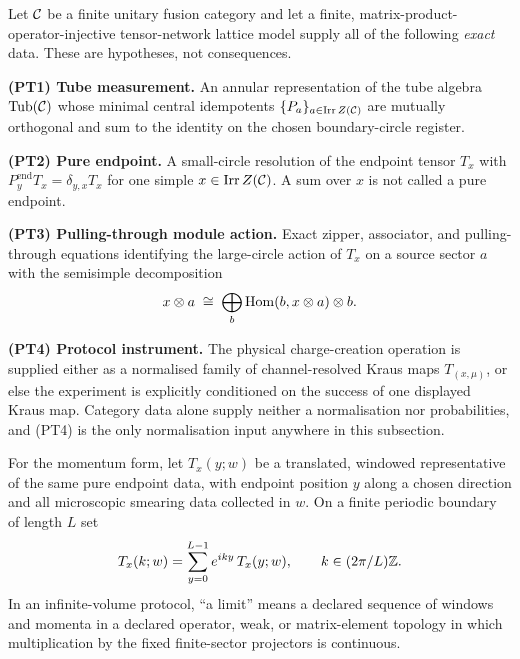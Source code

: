 \begin{definition}\label{def:peps-typing}
Let $\mathcal{C}$ be a finite unitary fusion category and let a finite,
matrix-product-operator-injective tensor-network lattice model supply all of
the following \emph{exact} data. These are hypotheses, not consequences.

\smallskip
\noindent\textbf{(PT1) Tube measurement.} An annular representation of the
tube algebra $\operatorname{Tub}(\mathcal{C})$ whose minimal central idempotents
$\{P_a\}_{a\in\operatorname{Irr}Z(\mathcal{C})}$ are mutually orthogonal and sum to
the identity on the chosen boundary-circle register.

\noindent\textbf{(PT2) Pure endpoint.} A small-circle resolution of the
endpoint tensor $T_x$ with $P^{\mathrm{end}}_yT_x=\delta_{y,x}T_x$ for one
simple $x\in\operatorname{Irr}Z(\mathcal{C})$. A sum over $x$ is not called a pure
endpoint.

\noindent\textbf{(PT3) Pulling-through module action.} Exact zipper,
associator, and pulling-through equations identifying the large-circle action
of $T_x$ on a source sector $a$ with the semisimple decomposition
\begin{equation}
  x\otimes a\;\cong\;\bigoplus_b\operatorname{Hom}(b,x\otimes a)\otimes b .
  \label{eq:pt-fusion}
\end{equation}

\noindent\textbf{(PT4) Protocol instrument.} The physical charge-creation
operation is supplied either as a normalised family of channel-resolved Kraus
maps $T_{(x,\mu)}$, or else the experiment is explicitly conditioned on the
success of one displayed Kraus map. Category data alone supply neither a
normalisation nor probabilities, and (PT4) is the only normalisation input
anywhere in this subsection.

\smallskip
For the momentum form, let $T_x(y;w)$ be a translated, windowed representative
of the same pure endpoint data, with endpoint position $y$ along a chosen
direction and all microscopic smearing data collected in $w$. On a finite
periodic boundary of length $L$ set
\begin{equation}
  T_x(k;w)=\sum_{y=0}^{L-1}e^{iky}\,T_x(y;w),
  \qquad k\in(2\pi/L)\mathbb{Z} .
  \label{eq:pt-fourier}
\end{equation}
In an infinite-volume protocol, ``a limit'' means a declared sequence of
windows and momenta in a declared operator, weak, or matrix-element topology
in which multiplication by the fixed finite-sector projectors is continuous.
\end{definition}

